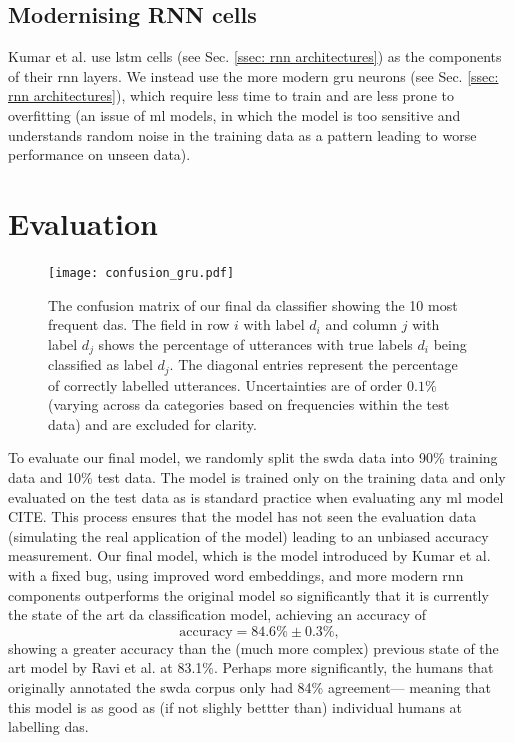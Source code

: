     \subsection{Modernising RNN cells}
    Kumar et al.\cite{kumar2017dialogue} use \gls{lstm} cells (see Sec. \ref{ssec: rnn architectures}) as the components of their \gls{rnn} layers. We instead use the more modern \gls{gru}\cite{chung2014empirical} \glspl{neuron} (see Sec. \ref{ssec: rnn architectures}), which require less time to train and are less prone to overfitting (an issue of \gls{ml} models, in which the \gls{model} is too sensitive and understands random noise in the training data as a pattern leading to worse performance on unseen data)\cite{chung2014empirical}.

    \section{Evaluation \label{ssec: method my da model evaluation}}
    
    \begin{figure}[t!]
        \centering
        \texttt{[image: confusion\_gru.pdf]}
        \caption{The confusion matrix of our final \gls{da} classifier showing the 10 most frequent \glspl{da}. The field in row $i$ with label $d_i$ and column $j$ with label $d_j$ shows the percentage of \glspl{utterance} with true labels $d_i$ being classified as label $d_j$. The diagonal entries represent the percentage of correctly labelled \glspl{utterance}. Uncertainties are of order $0.1\%$ (varying across \gls{da} categories based on frequencies within the test data) and are excluded for clarity.}
        \label{fig:confusion}
    \end{figure}

    To evaluate our final \gls{model}, we randomly split the \gls{swda} data into 90\% training data and 10\% test data. The \gls{model} is trained only on the training data and only evaluated on the test data as is standard practice when evaluating any \gls{ml} \gls{model} CITE. This process ensures that the \gls{model} has not seen the evaluation data (simulating the real application of the \gls{model}) leading to an unbiased accuracy measurement.
    Our final \gls{model}, which is the \gls{model} introduced by Kumar et al.\cite{kumar2017dialogue} with a fixed bug, using improved word \glspl{embedding}, and more modern \gls{rnn} components outperforms the original \gls{model} so significantly that it is currently the state of the art \gls{da} classification \gls{model}, achieving an accuracy of
    \begin{equation}
        \text{accuracy} = 84.6 \% \pm 0.3\%,
        \label{eq: my da model accuracy}
    \end{equation}
    showing a greater accuracy than the (much more complex) previous state of the art \gls{model} by Ravi et al. at 83.1\%\cite{ravi2018self}. Perhaps more significantly, the humans that originally annotated the \gls{swda} corpus only had 84\% agreement\cite{swda}--- meaning that this \gls{model} is as good as (if not slighly bettter than) individual humans at labelling \glspl{da}. 
    
